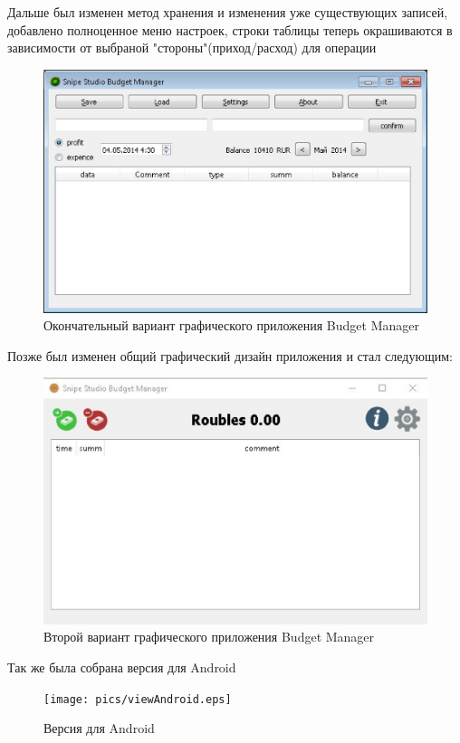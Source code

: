 Дальше был изменен метод хранения и изменения уже существующих записей, добавлено полноценное меню настроек, строки таблицы теперь окрашиваются в зависимости от выбраной "стороны"(приход/расход) для операции

\begin{figure}[H]
	\centering
	\includegraphics[width=0.7\linewidth]{pics/view1.eps}
	\caption{Окончательный вариант графического приложения Budget Manager}
	\label{fig:view1}
\end{figure}

Позже был изменен общий графический дизайн приложения 	и стал следующим:

\begin{figure}[H]
	\centering
	\includegraphics[width=0.7\linewidth]{pics/view2.eps}
	\caption{Второй вариант графического приложения Budget Manager}
	\label{fig:view2}
\end{figure}

Так же была собрана версия для Android

\begin{figure}[H]
	\centering
	
	\texttt{[image: pics/viewAndroid.eps]}
	\caption{Версия для Android}
	\label{fig:viewAndroid}
\end{figure}

